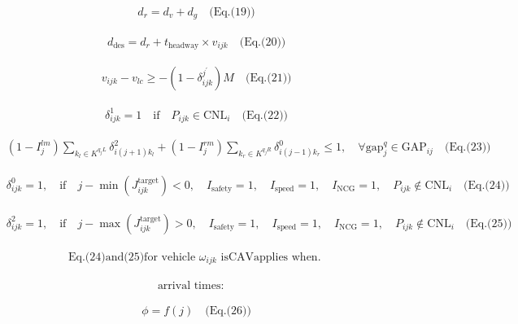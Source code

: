 \documentclass[10pt]{article}
\begin{document}
\[\begin{aligned}&\quad d_{r} = d_{v} + d_{g} \quad \text{(Eq.(19))}\end{aligned}\]

\[\begin{aligned}&\quad d_{\text{des}} = d_{r} + t_{\text{headway}} \times v_{ijk} \quad \text{(Eq.(20))}\end{aligned}\]

\[\begin{aligned}&\quad v_{ijk} - v_{lc} \geq - (1 - \delta^{j^{\prime}}_{ijk}) M \quad \text{(Eq.(21))}\end{aligned}\]

\[\begin{aligned}&\quad \delta^{1}_{ijk} = 1 \quad \text{if} \quad P_{ijk} \in \text{CNL}_{i} \quad \text{(Eq.(22))}\end{aligned}\]

\[\begin{aligned}&\quad (1 - I^{lm}_{j}) \sum_{k_{l} \in K^{q_{j}L}} \delta^{2}_{i(j+1)k_l} + (1 - I^{rm}_{j}) \sum_{k_{r} \in K^{q_{j}R}} \delta^{0}_{i(j-1)k_r} \leq 1, \quad \forall \text{gap}^{q}_{j} \in \text{GAP}_{ij} \quad \text{(Eq.(23))}\end{aligned}\]

\[\begin{aligned}&\quad \delta^{0}_{ijk} = 1, \quad \text{if} \quad j - \min(J^{\text{target}}_{ijk}) < 0, \quad I_{\text{safety}} = 1, \quad I_{\text{speed}} = 1, \quad I_{\text{NCG}} = 1, \quad P_{ijk} \notin \text{CNL}_{i} \quad \text{(Eq.(24))}\end{aligned}\]

\[\begin{aligned}&\quad \delta^{2}_{ijk} = 1, \quad \text{if} \quad j - \max(J^{\text{target}}_{ijk}) > 0, \quad I_{\text{safety}} = 1, \quad I_{\text{speed}} = 1, \quad I_{\text{NCG}} = 1, \quad P_{ijk} \notin \text{CNL}_{i} \quad \text{(Eq.(25))}\end{aligned}\]

\[\begin{aligned}&\quad \text{Eq.(24)and(25)for vehicle } \omega_{ijk} \text{ isCAVapplies when. }\end{aligned}\]

\[\begin{aligned}&\text{arrival times:}\end{aligned}\]

\[\begin{aligned}&\quad \phi = f(j) \quad \text{(Eq.(26))}\end{aligned}\]
\end{document}
